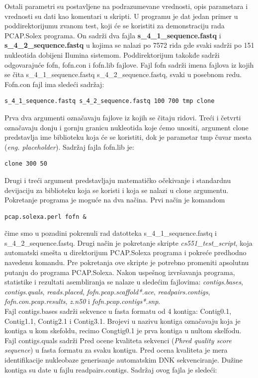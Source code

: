 \documentclass[a4paper]{article}
\begin{document}
{Ostali parametri su postavljene na podrazumevane vrednosti, opis parametara i vrednosti su dati kao komentari u skripti. U programu je dat jedan primer u poddirektorijumu zvanom test, koji će se koristiti za demonstraciju rada PCAP.Solex programa. On sadrži dva fajla \textbf{s\_4\_1\_sequence.fastq} i \textbf{s\_4\_2\_sequence.fastq} u kojima se nalazi po 7572 rida gde svaki sadrži po 151 nukleotida dobijeni Ilumina sistemom. Poddirektorijum takokđe sadrži odgovarajuće fofn, fofn.con i fofn.lib fajlove. Fajl fofn sadrži imena fajlova iz kojih se čita s\_4\_1\_sequence.fastq s\_4\_2\_sequence.fastq, svaki u posebnom redu. Fofn.con fajl ima sledeći sadržaj: 
\begin{verbatim}
s_4_1_sequence.fastq s_4_2_sequence.fastq 100 700 tmp clone
\end{verbatim}
Prva dva argumenti označavaju fajlove iz kojih se čitaju ridovi. Treći i četvrti označavaju donju i gornju granicu nukleotida koje ćemo unositi, argument clone predstavlja ime biblioteku koja će se koristiti, dok je parametar tmp čuvar mesta (\textit{eng. placeholder}). Sadržaj fajla fofn.lib je:
\begin{verbatim}
clone 300 50
\end{verbatim}
Drugi i treći argument predstavljaju matematičko očekivanje i standardnu devijaciju za biblioteku koja se koristi i koja se nalazi u clone argumentu. Pokretanje programa je moguće na dva načina. Prvi način je komandom 
\begin{verbatim}
pcap.solexa.perl fofn &
\end{verbatim}
čime smo u pozadini pokrenuli rad datotteka s\_4\_1\_sequence.fastq i s\_4\_2\_sequence.fastq. Drugi način je pokretanje skripte \textit{cs551\_test\_script}, koja automatski smešta u direktorijum PCAP.Solexa programa i pokreće predhodno navedenu komandu. Pre pokretanja ove skripte je potrebno promeniti apsolutnu putanju do programa PCAP.Solexa.
Nakon uspešnog izvršavanja programa, statistike i rezultati asembliranja se nalaze u sledećim fajlovima: \textit{contigs.bases}, \textit{contigs.quals}, \textit{reads.placed}, \textit{fofn.pcap.scaffold*.ace}, \textit{readpairs.contigs}, \textit{fofn.con.pcap.results}, \textit{z.n50} i \textit{fofn.pcap.contigs*.snp}. \\
Fajl contigs.bases sadrži sekvence u fasta formatu od 4 kontiga: Contig0.1, Contig1.1, Contig2.1 i Contig3.1. Brojevi u nazivu kontiga označavaju koja je kontiga u kom skefoldu, recimo Congtig0.1 je prva kontiga u nultom skelfodu. Fajl contigs.quals sadrži Pred ocene kvaliteta sekvenci (\textit{Phred quality score sequence}) u fasta formatu za svaku kontigu. Pred ocena kvaliteta je mera identifikacije nukleobaze generisanje automatskim DNK sekvenciranje. Dužine kontiga su date u fajlu readpairs.contigs. Sadržaj ovog fajla je sledeći:
}
\end{document}
